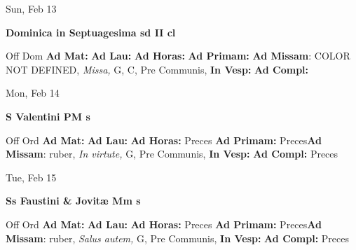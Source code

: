 \documentclass[10pt]{memoir}
\begin{document}
\begin{center}
\begin{minipage}{3.5in}
\vspace{2em}
\begin{center}Sun, Feb 13
\end{center}
\textbf{ \large Dominica in Septuagesima
\textnormal{\normalsize sd II cl}}

\begin{justify}Off Dom
\textbf{Ad Mat: }
\textbf{Ad Lau: }
\textbf{Ad Horas: }
\textbf{Ad Primam: }\textbf{Ad Missam}: COLOR NOT DEFINED, \textit{Missa,} G, C, Pre Communis, 
\textbf{In Vesp: }
\textbf{Ad Compl: }
\end{justify}
\end{minipage}
\end{center}

\begin{center}
\begin{minipage}{3.5in}
\vspace{2em}
\begin{center}Mon, Feb 14
\end{center}
\textbf{ \large S Valentini PM
\textnormal{\normalsize s}}

\begin{justify}Off Ord
\textbf{Ad Mat: }
\textbf{Ad Lau: }
\textbf{Ad Horas: }Preces
\textbf{Ad Primam: }Preces\textbf{Ad Missam}: ruber, \textit{In virtute,} G, Pre Communis, 
\textbf{In Vesp: }
\textbf{Ad Compl: }Preces
\end{justify}
\end{minipage}
\end{center}

\begin{center}
\begin{minipage}{3.5in}
\vspace{2em}
\begin{center}Tue, Feb 15
\end{center}
\textbf{ \large Ss Faustini \& Jovitæ Mm
\textnormal{\normalsize s}}

\begin{justify}Off Ord
\textbf{Ad Mat: }
\textbf{Ad Lau: }
\textbf{Ad Horas: }Preces
\textbf{Ad Primam: }Preces\textbf{Ad Missam}: ruber, \textit{Salus autem,} G, Pre Communis, 
\textbf{In Vesp: }
\textbf{Ad Compl: }Preces
\end{justify}
\end{minipage}
\end{center}
\end{document}
